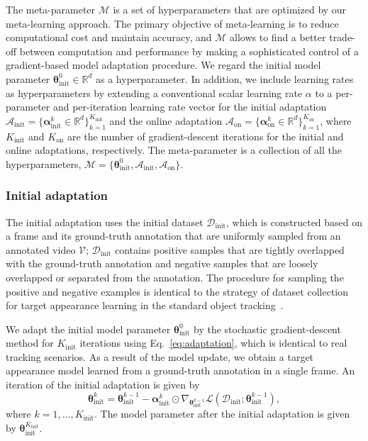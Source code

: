 \documentclass[letterpaper]{article} %
\def \datainit{\mathcal{D}_\text{init}}
\def \thetainit{{\boldsymbol{\theta}_\text{init}^0}}
\def \thetainitadapt{\boldsymbol{\theta}_\text{init}}
\def \alphainit{\boldsymbol{\alpha}_\text{init}}
\def \alphaonline{\boldsymbol{\alpha}_\text{on}}
\def \Ainit{\mathcal{A}_\text{init}}
\def \Aonline{\mathcal{A}_\text{on}}
\def \Kinit{K_\text{init}}
\def \Konline{K_\text{on}}
\begin{document}
The meta-parameter $\mathcal{M}$ is a set of hyperparameters that are optimized by our meta-learning approach.
The primary objective of meta-learning is to reduce computational cost and maintain accuracy, and $\mathcal{M}$ allows to find a better trade-off between computation and performance by making a sophisticated control of a gradient-based model adaptation procedure.
We regard the initial model parameter $\thetainit \in \mathbb{R}^d$ as a hyperparameter.
In addition, we include learning rates as hyperparameters by extending a conventional scalar learning rate $\alpha$ to a per-parameter and per-iteration learning rate vector for the initial adaptation $\Ainit=\{\alphainit^k \in \mathbb{R}^d\}^{\Kinit}_{k=1}$ and the online adaptation $\Aonline=\{\alphaonline^k \in \mathbb{R}^d\}^{\Konline}_{k=1}$, where $\Kinit$ and $\Konline$ are the number of gradient-descent iterations for the initial and online adaptations, respectively.
The meta-parameter is a collection of all the hyperparameters, $\mathcal{M}=\{\thetainit,\Ainit,\Aonline\}$.


\subsubsection{Initial adaptation}
The initial adaptation uses the initial dataset $\datainit$, which is constructed based on a frame and its ground-truth annotation that are uniformly sampled from an annotated video $\mathcal{V}$;
$\datainit$ contains positive samples that are tightly overlapped with the ground-truth annotation and negative samples that are loosely overlapped or separated from the annotation.
The procedure for sampling the positive and negative examples is identical to the strategy of dataset collection for target appearance learning in the standard object tracking~\cite{jung2018realtime}.

We adapt the initial model parameter $\thetainit$ by the stochastic gradient-descent method for $\Kinit$ iterations using Eq.~\eqref{eq:adaptation}, which is identical to real tracking scenarios.
As a result of the model update, we obtain a target appearance model learned from a ground-truth annotation in a single frame.
An iteration of the initial adaptation is given by
\begin{equation}
\thetainitadapt^k = \thetainitadapt^{k-1} - \alphainit^k \odot \nabla_{\thetainitadapt^{k-1}}\mathcal{L}(\datainit ; \thetainitadapt^{k-1}),
\label{eq:strong_adaptation}
\end{equation}
where  $k=1, \dots, \Kinit$.
The model parameter after the initial adaptation is given by $\thetainitadapt^{\Kinit}$.
\end{document}
